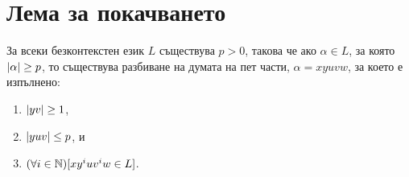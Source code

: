 \section{Лема за покачването}

\begin{lemma}
  \label{lem:pumping-context} 
  За всеки безконтекстен език $L$ съществува $p>0$, такова
  че ако $\alpha\in L$, за която $\vert{\alpha}\vert \geq p$, то съществува разбиване на думата на пет части, $\alpha=xyuvw$,
  за което е изпълнено:
  \begin{enumerate}[1)]
  \item
    $\vert{yv}\vert\geq 1$,
  \item
    $\vert{yuv}\vert\leq p$, и
  \item
    $(\forall i\in\mathbb{N})[xy^iuv^iw\in L]$.
\end{enumerate}
\end{lemma}
